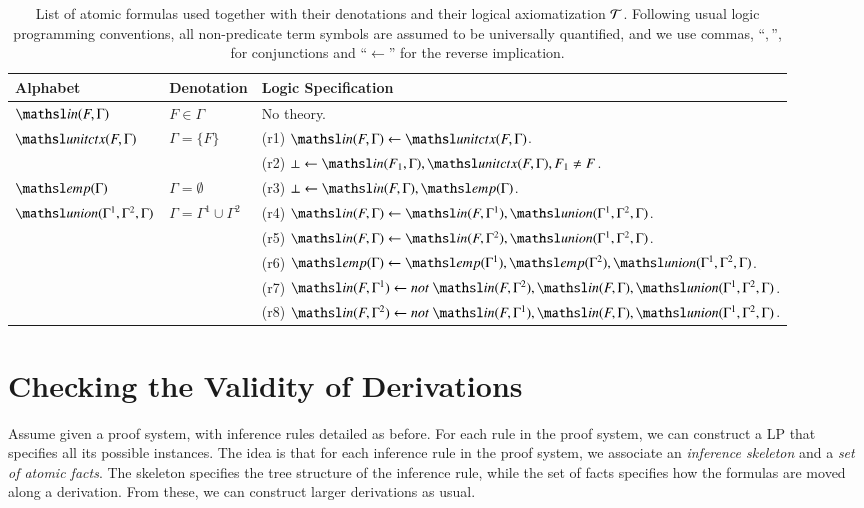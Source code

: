 \documentclass{new_tlp}
\newcommand\dnot{\ensuremath{\mathit{not}}\xspace}
\newcommand{\elin}[2]{\ensuremath{{\tsl{unitctx}(\ensuremath{#1}, \ensuremath{#2})}}}
\newcommand{\emp}[1]{\ensuremath{{\tsl{emp}(\ensuremath{#1})}}}
\newcommand{\union}[3]{\ensuremath{{\tsl{union}(\ensuremath{#1},\ensuremath{#2},\ensuremath{ #3})}}}
\newcommand{\In}[2]{\ensuremath{\tsl{in}(\ensuremath{#1},\ensuremath{#2})}}
\begin{document}
\newcommand\xor{\veebar}
\newcommand\thSeq{\ensuremath{\Tscr}}
\newcommand\groundSet{\ensuremath{\mathcal{B}}}
\begin{table}[t]
\caption{\small List of atomic formulas used together
with their denotations and their logical axiomatization $\thSeq$. Following 
usual logic programming conventions, all non-predicate term symbols are assumed 
to be universally quantified, and we use commas, ``$,$'', for conjunctions and
 ``$\leftarrow$'' for the reverse implication.}
\label{fig:predicates}
\begin{tabular}{l@{\quad}p{2cm}@{\quad}l}
\toprule
Alphabet & Denotation & Logic Specification \\[1pt]
\midrule
$\In{F}{\Gamma}$ & $F \in \Gamma$ & No theory.\\
\midrule
$\elin{F}{\Gamma}$ &  $\Gamma = \{F\}$ & (r1) $\In{F}{\Gamma} \leftarrow \elin{F}{\Gamma}$. \\[1pt]
&& (r2) $\bot \leftarrow \In{F_1}{\Gamma}, \elin{F}{\Gamma}, F_1 \neq F$. \\
\midrule
$\emp{\Gamma}$ & $\Gamma = \emptyset$ 
&  (r3) $\bot \leftarrow \In{F}{\Gamma}, \emp{\Gamma}$. \\
\midrule
$\union{\Gamma^1} {\Gamma^2} {\Gamma}$ & $\Gamma = \Gamma^1 \cup \Gamma^2$ & 
   (r4) $\In{F}{\Gamma} \leftarrow \In{F}{\Gamma^1}, \union{\Gamma^1}{\Gamma^2}{\Gamma}$. \\[1pt]
&& (r5) $\In{F}{\Gamma} \leftarrow \In{F}{\Gamma^2}, \union{\Gamma^1}{\Gamma^2}{\Gamma}$. \\[1pt]
&& (r6) $\emp{\Gamma}  \leftarrow \emp{\Gamma^1},\emp{\Gamma^2}, \union{\Gamma^1}{\Gamma^2}{\Gamma}$. \\[1pt]
&& (r7) $\In{F}{\Gamma^1}  \leftarrow \dnot\ \In{F}{\Gamma^2}, \In{F}{\Gamma}, \union{\Gamma^1}{\Gamma^2}{\Gamma}$. \\
&& (r8) $\In{F}{\Gamma^2}  \leftarrow \dnot\ \In{F}{\Gamma^1}, \In{F}{\Gamma}, \union{\Gamma^1}{\Gamma^2}{\Gamma}$. \\
\bottomrule
\end{tabular}
\vspace{-4mm}
\end{table}

\vspace{-2mm}
\section{Checking the Validity of Derivations}
\label{sec:derivations} 

Assume given a proof system, with inference rules detailed as before. 
For each rule in the proof system, we can construct a LP that specifies all 
its possible instances. The idea is that for each inference rule in the proof system, 
we associate an \emph{inference skeleton} and a \emph{set of atomic facts}. 
The skeleton specifies the tree structure of the inference rule, while the set of 
facts specifies how the formulas are moved along a derivation. 
From these, we can construct larger derivations as usual.
\end{document}

